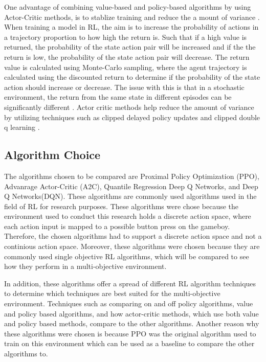 
One advantage of combining value-based and policy-based algorithms by using Actor-Critic methods, is to stablize training and reduce the a mount of variance \cite{SergiosKaragiannakos2018}. When training a model in RL, the aim is to increase the probability of actions in a trajectory proportion to how high the return is. Such that if a high value is returned, the probability of the state action pair will be increased and if the the return is low, the probability of the state action pair will decrease. The return value is calculated using Monte-Carlo sampling, where the agent trajectory is calculated using the discounted return to determine if the probability of the state action should increase or decrease. The issue with this is that in a stochastic environment, the return from the same state in different episodes can be significantly different \cite{ThomasSimonini2022A2C}. Actor critic methods help reduce the amount of variance by utilizing techniques such as clipped delayed policy updates and clipped double q learning \cite{padhye2023deep}.

\subsection{Algorithm Choice}

The algorithms chosen to be compared are Proximal Policy Optimization (PPO), Advanrage Actor-Critic (A2C), Quantile Regression Deep Q Networks, and Deep Q Networks(DQN). These algorithms are commonly used algorithms used in the field of RL for research purposes. These algorithms were chose because the environment used to conduct this research holds a discrete action space, where each action input is mapped to a possible button press on the gameboy. Therefore, the chosen algorithms had to support a discrete action space and not a continious action space. Moreover, these algorithms were chosen because they are commonly used single objective RL algorithms, which will be compared to see how they perform in a multi-objective environment.

In addition, these algorithms offer a spread of different RL algorithm techniques to determine which techniques are best suited for the multi-objective environment. Techniques such as comparing on and off policy algorithms, value and policy based algorithms, and how actor-critic methods, which use both value and policy based methods, compare to the other algorithms. Another reason why these algorithms were chosen is because PPO was the original algorithm used to train on this environment which can be used as a baseline to compare the other algorithms to. 

